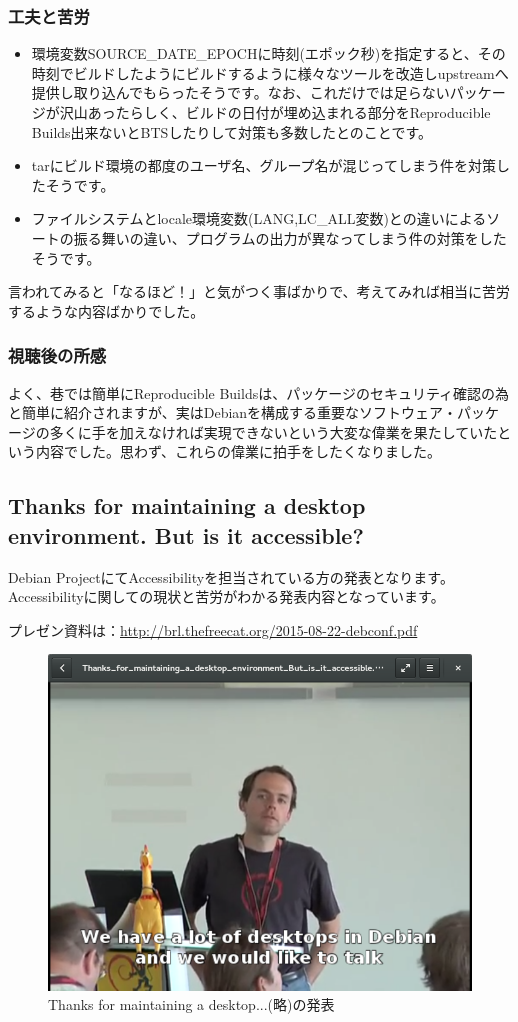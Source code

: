 \documentclass[mingoth,a4paper]{jsarticle}
\begin{document}
\subsubsection{工夫と苦労}
 
\begin{itemize}
\item 環境変数SOURCE\_DATE\_EPOCHに時刻(エポック秒)を指定すると、その時刻でビルドしたようにビルドするように様々なツールを改造しupstreamへ提供し取り込んでもらったそうです。なお、これだけでは足らないパッケージが沢山あったらしく、ビルドの日付が埋め込まれる部分をReproducible Builds出来ないとBTSしたりして対策も多数したとのことです。
\item tarにビルド環境の都度のユーザ名、グループ名が混じってしまう件を対策したそうです。
\item ファイルシステムとlocale環境変数(LANG,LC\_ALL変数)との違いによるソートの振る舞いの違い、プログラムの出力が異なってしまう件の対策をしたそうです。
\end{itemize}

言われてみると「なるほど！」と気がつく事ばかりで、考えてみれば相当に苦労するような内容ばかりでした。

\subsubsection{視聴後の所感}

よく、巷では簡単にReproducible Buildsは、パッケージのセキュリティ確認の為と簡単に紹介されますが、実はDebianを構成する重要なソフトウェア・パッケージの多くに手を加えなければ実現できないという大変な偉業を果たしていたという内容でした。思わず、これらの偉業に拍手をしたくなりました。

\subsection{Thanks for maintaining a desktop environment. But is it accessible?}

 Debian ProjectにてAccessibilityを担当されている方の発表となります。
Accessibilityに関しての現状と苦労がわかる発表内容となっています。

 プレゼン資料は：\url{http://brl.thefreecat.org/2015-08-22-debconf.pdf}

\begin{figure}[H]
\begin{center}
\includegraphics[width=0.5\hsize]{image201510/accessibility.png}
\end{center}
\caption{Thanks for maintaining a desktop...(略)の発表}
\end{figure}
\end{document}
